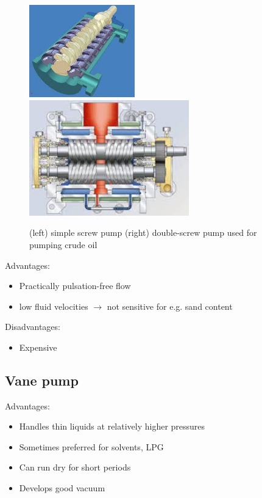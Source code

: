 \begin{figure}[h!]
\begin{center}
\includegraphics[height=4cm]{figs/simple_screw_pump.jpg}
\hspace{1cm}
\includegraphics[height=5cm]{figs/double-screw_pump.jpg}
\caption{\label{fig:screw_pumps} (left) simple screw pump (right) double-screw pump used for pumping crude oil}
\end{center}
\end{figure}

\noindent Advantages:
\begin{itemize}
\item Practically pulsation-free flow
\item low fluid velocities $\rightarrow$ not sensitive for e.g. sand content
\end{itemize}

\noindent Disadvantages:
\begin{itemize}
\item Expensive
\end{itemize} 

\subsection{Vane pump}

\noindent Advantages:
\begin{itemize}
\item Handles thin liquids at relatively higher pressures
\item Sometimes preferred for solvents, LPG
\item Can run dry for short periods
\item Develops good vacuum
\end{itemize}

